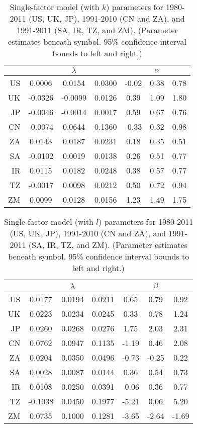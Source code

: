 \documentclass[preprint,authoryear,12pt]{elsarticle}\usepackage{graphicx, color}
\begin{document}
\begin{table}[H]
\begin{center}
\caption{Single-factor model (with $k$) parameters for 1980-2011 (US, UK, JP), 1991-2010 (CN and ZA), and 1991-2011 (SA, IR, TZ, and ZM). (Parameter estimates beneath symbol. 95\% confidence interval bounds to left and right.)}
\label{tab:SF_Parameters_With_K}
{\tiny
\begin{tabular}{r|ccc|ccc}
  \hline
 &   & $\lambda$ &   &   & $\alpha$ &   \\ 
  \hline
US & 0.0006 & 0.0154 & 0.0300 & -0.02 & 0.38 & 0.78 \\ 
  UK & -0.0326 & -0.0099 & 0.0126 & 0.39 & 1.09 & 1.80 \\ 
  JP & -0.0046 & -0.0014 & 0.0017 & 0.59 & 0.67 & 0.76 \\ 
  CN & -0.0074 & 0.0644 & 0.1360 & -0.33 & 0.32 & 0.98 \\ 
  ZA & 0.0143 & 0.0187 & 0.0231 & 0.18 & 0.35 & 0.51 \\ 
  SA & -0.0102 & 0.0019 & 0.0138 & 0.26 & 0.51 & 0.77 \\ 
  IR & 0.0115 & 0.0182 & 0.0248 & 0.38 & 0.57 & 0.77 \\ 
  TZ & -0.0017 & 0.0098 & 0.0212 & 0.50 & 0.72 & 0.94 \\ 
  ZM & 0.0099 & 0.0128 & 0.0156 & 1.23 & 1.49 & 1.75 \\ 
   \hline
\end{tabular}
}
\end{center}
\end{table}
\begin{table}[H]
\begin{center}
\caption{Single-factor model (with $l$) parameters for 1980-2011 (US, UK, JP), 1991-2010 (CN and ZA), and 1991-2011 (SA, IR, TZ, and ZM). (Parameter estimates beneath symbol. 95\% confidence interval bounds to left and right.)}
\label{tab:SF_Parameters_With_L}
{\tiny
\begin{tabular}{r|ccc|ccc}
  \hline
 &   & $\lambda$ &   &   & $\beta$ &   \\ 
  \hline
US & 0.0177 & 0.0194 & 0.0211 & 0.65 & 0.79 & 0.92 \\ 
  UK & 0.0223 & 0.0234 & 0.0245 & 0.33 & 0.78 & 1.24 \\ 
  JP & 0.0260 & 0.0268 & 0.0276 & 1.75 & 2.03 & 2.31 \\ 
  CN & 0.0762 & 0.0947 & 0.1135 & -1.19 & 0.46 & 2.08 \\ 
  ZA & 0.0204 & 0.0350 & 0.0496 & -0.73 & -0.25 & 0.22 \\ 
  SA & 0.0028 & 0.0087 & 0.0144 & 0.36 & 0.54 & 0.73 \\ 
  IR & 0.0108 & 0.0250 & 0.0391 & -0.06 & 0.36 & 0.77 \\ 
  TZ & -0.1038 & 0.0450 & 0.1977 & -5.21 & 0.06 & 5.20 \\ 
  ZM & 0.0735 & 0.1000 & 0.1281 & -3.65 & -2.64 & -1.69 \\ 
   \hline
\end{tabular}
}
\end{center}
\end{table}
\end{document}
